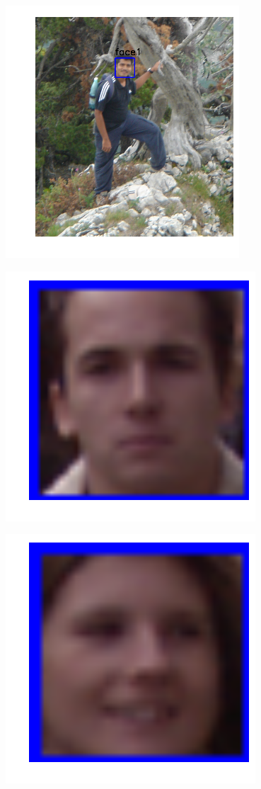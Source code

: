 \includegraphics{facedetection_files/facedetection_59_1.png}

\includegraphics{facedetection_files/facedetection_59_2.png}

\includegraphics{facedetection_files/facedetection_59_3.png}

